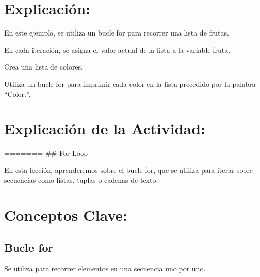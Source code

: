 \documentclass[
  a4paper,
  onepage,
  openany]{scrreprt}
\begin{document}
\hypertarget{explicaciuxf3n-42}{%
\section{Explicación:}\label{explicaciuxf3n-42}}

En este ejemplo, se utiliza un bucle for para recorrer una lista de
frutas.

En cada iteración, se asigna el valor actual de la lista a la variable
fruta.

\begin{tcolorbox}[enhanced jigsaw, breakable, opacityback=0, toptitle=1mm, coltitle=black, toprule=.15mm, rightrule=.15mm, colframe=quarto-callout-important-color-frame, opacitybacktitle=0.6, arc=.35mm, title=\textcolor{quarto-callout-important-color}{\faExclamation}\hspace{0.5em}{Actividad Práctica:}, titlerule=0mm, colbacktitle=quarto-callout-important-color!10!white, bottomtitle=1mm, bottomrule=.15mm, colback=white, left=2mm, leftrule=.75mm]

Crea una lista de colores.

Utiliza un bucle for para imprimir cada color en la lista precedido por
la palabra ``Color:''.

\end{tcolorbox}

\hypertarget{explicaciuxf3n-de-la-actividad-40}{%
\section{Explicación de la
Actividad:}\label{explicaciuxf3n-de-la-actividad-40}}

======= \#\# For Loop

En esta lección, aprenderemos sobre el bucle for, que se utiliza para
iterar sobre secuencias como listas, tuplas o cadenas de texto.

\hypertarget{conceptos-clave-43}{%
\section{Conceptos Clave:}\label{conceptos-clave-43}}

\hypertarget{bucle-for-1}{%
\subsection{Bucle for}\label{bucle-for-1}}

Se utiliza para recorrer elementos en una secuencia uno por uno.
\end{document}

